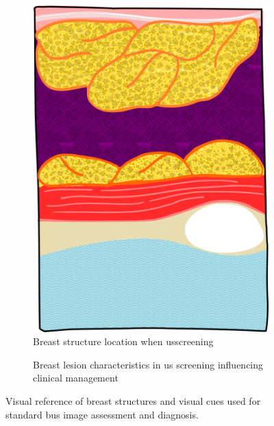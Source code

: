 \begin{figure}
\begin{subfigure}[b]{0.2\textwidth}
        \includegraphics[width=\textwidth]{slice}
        \caption[]%
        {{\small Breast structure location when \ac{us}screening}}
        \label{fig:lesions:slice}
    \end{subfigure}
    \hfill
    \begin{subfigure}[b]{0.5\textwidth}   
        \centering 
        \caption[]%
        {Breast lesion characteristics in \ac{us} screening influencing clinical management~\cite{raza2010us}}    
        \label{fig:lesions:lesions}
    \end{subfigure}
    \caption {{\small Visual reference of breast structures and visual cues used for standard \ac{bus} image assessment and diagnosis.}} 
    \label{fig:lesions}
\end{figure}

